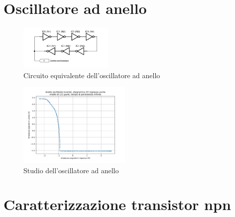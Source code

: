 \documentclass[journal]{IEEEtran}
\begin{document}
\begin{appendices}

\section{Oscillatore ad anello}

\begin{figure}[H]%
\begin{center}
\includegraphics[width=0.40\textwidth]{sch-simulations/digital/output/ring-osc-logic.pdf}
\caption{Circuito equivalente dell'oscillatore ad anello}
\label{fig:circuit_ring_oscillator}
\end{center}
\end{figure}

\begin{figure}[H]%
\begin{center}
\includegraphics[width=0.48\textwidth]{analysis/output/inverter_ring_xy.pdf}
\caption{Studio dell'oscillatore ad anello}
\label{fig:inverter_ring_xy}
\end{center}
\end{figure}


\section{Caratterizzazione transistor npn}


\end{appendices}


\clearpage
\newpage

\tableofcontents %

\printbibliography %
\end{document}
